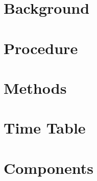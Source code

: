\documentclass{article}
\begin{document}
\section{Background}

\lipsum[1]

\section{Procedure} %

\lipsum[1]

\section{Methods}

\lipsum[1]

\section{Time Table}

\lipsum[1]

\section{Components}

\lipsum[1]

\pagebreak

\printbibliography
\end{document}
